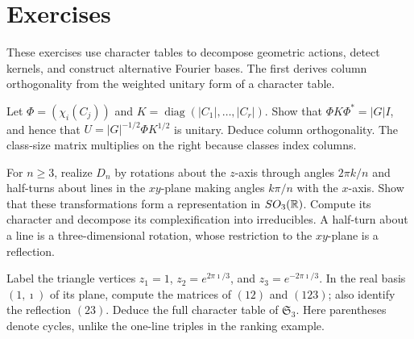 \section{Exercises}
\label{sect1-chap6-exercises}

These exercises use character tables to decompose geometric actions, detect
kernels, and construct alternative Fourier bases. The first derives column
orthogonality from the weighted unitary form of a character table.

\begin{exo}
\label{exo-orthogonalite-caracteres}
Let $\Phi=(\chi_i(C_j))$ and $K=\operatorname{diag}(|C_1|,\ldots,|C_r|)$.
Show that $\Phi K\Phi^*=|G|I$, and hence that
$U=|G|^{-1/2}\Phi K^{1/2}$ is unitary. Deduce column orthogonality.
The class-size matrix multiplies on the right because classes index columns.
\end{exo}


\begin{exo}
\label{exo-repr-groupe-diedral}
For $n\geq3$, realize $D_n$ by rotations about the $z$-axis through
angles $2\pi k/n$ and half-turns about lines in the $xy$-plane making
angles $k\pi/n$ with the $x$-axis. Show that these transformations form
a representation in $SO_3(\mathbb{R})$. Compute its character and decompose
its complexification into irreducibles.
A half-turn about a line is a three-dimensional rotation, whose restriction
to the $xy$-plane is a reflection.
\end{exo}


\begin{exo}
\label{exo-representation-s3}
Label the triangle vertices $z_1=1$, $z_2=e^{2\pi\imath/3}$, and
$z_3=e^{-2\pi\imath/3}$. In the real basis $(1,\imath)$ of its plane,
compute the matrices of $(12)$ and $(123)$; also identify the reflection
$(23)$. Deduce the full character table of $\mathfrak S_3$.
Here parentheses denote cycles, unlike the one-line triples in the ranking
example.
\end{exo}


